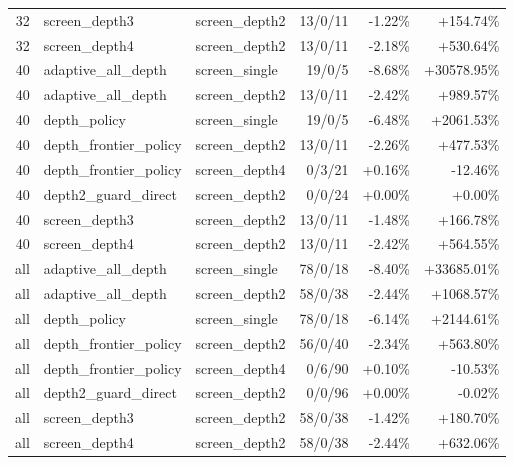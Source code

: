 \begin{tabular}{rllrrr}
32 & screen_depth3 & screen_depth2 & 13/0/11 & -1.22\% & +154.74\% \\
32 & screen_depth4 & screen_depth2 & 13/0/11 & -2.18\% & +530.64\% \\
40 & adaptive_all_depth & screen_single & 19/0/5 & -8.68\% & +30578.95\% \\
40 & adaptive_all_depth & screen_depth2 & 13/0/11 & -2.42\% & +989.57\% \\
40 & depth_policy & screen_single & 19/0/5 & -6.48\% & +2061.53\% \\
40 & depth_frontier_policy & screen_depth2 & 13/0/11 & -2.26\% & +477.53\% \\
40 & depth_frontier_policy & screen_depth4 & 0/3/21 & +0.16\% & -12.46\% \\
40 & depth2_guard_direct & screen_depth2 & 0/0/24 & +0.00\% & +0.00\% \\
40 & screen_depth3 & screen_depth2 & 13/0/11 & -1.48\% & +166.78\% \\
40 & screen_depth4 & screen_depth2 & 13/0/11 & -2.42\% & +564.55\% \\
all & adaptive_all_depth & screen_single & 78/0/18 & -8.40\% & +33685.01\% \\
all & adaptive_all_depth & screen_depth2 & 58/0/38 & -2.44\% & +1068.57\% \\
all & depth_policy & screen_single & 78/0/18 & -6.14\% & +2144.61\% \\
all & depth_frontier_policy & screen_depth2 & 56/0/40 & -2.34\% & +563.80\% \\
all & depth_frontier_policy & screen_depth4 & 0/6/90 & +0.10\% & -10.53\% \\
all & depth2_guard_direct & screen_depth2 & 0/0/96 & +0.00\% & -0.02\% \\
all & screen_depth3 & screen_depth2 & 58/0/38 & -1.42\% & +180.70\% \\
all & screen_depth4 & screen_depth2 & 58/0/38 & -2.44\% & +632.06\% \\
\bottomrule
\end{tabular}
